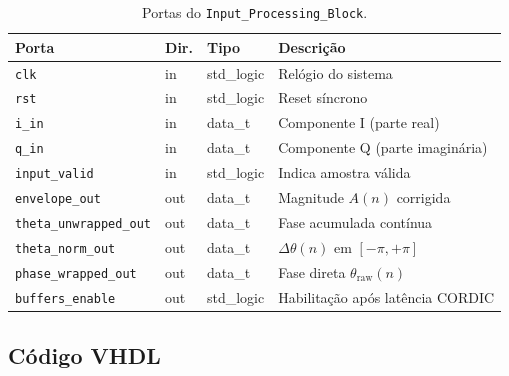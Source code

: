 \documentclass[a4paper,12pt]{article}
\begin{document}
\begin{table}[H]
\centering
\caption{Portas do \texttt{Input\_Processing\_Block}.}
\label{tab:ipb_ports}
\small
\begin{tabular}{llll}
\hline
\textbf{Porta} & \textbf{Dir.} & \textbf{Tipo} & \textbf{Descri\c{c}\~ao} \\
\hline
\texttt{clk}                   & in  & std\_logic & Rel\'ogio do sistema \\
\texttt{rst}                   & in  & std\_logic & Reset s\'incrono \\
\texttt{i\_in}                 & in  & data\_t    & Componente I (parte real) \\
\texttt{q\_in}                 & in  & data\_t    & Componente Q (parte imagin\'aria) \\
\texttt{input\_valid}          & in  & std\_logic & Indica amostra v\'alida \\
\hline
\texttt{envelope\_out}         & out & data\_t    & Magnitude $A(n)$ corrigida \\
\texttt{theta\_unwrapped\_out} & out & data\_t    & Fase acumulada cont\'inua \\
\texttt{theta\_norm\_out}      & out & data\_t    & $\Delta\theta(n)$ em $[-\pi,+\pi]$ \\
\texttt{phase\_wrapped\_out}   & out & data\_t    & Fase direta $\theta_{\text{raw}}(n)$ \\
\texttt{buffers\_enable}       & out & std\_logic & Habilita\c{c}\~ao ap\'os lat\^encia CORDIC \\
\hline
\end{tabular}
\end{table}


\subsection{C\'odigo VHDL}
\end{document}
